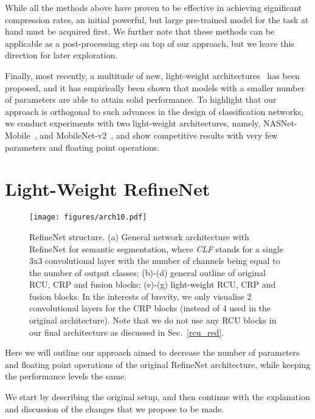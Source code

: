 \documentclass{bmvc2k}
\begin{document}
While all the methods above have proven to be effective in achieving significant compression rates, an initial powerful, but large pre-trained model for the task at hand must be acquired first. We further note that these methods can be applicable as a post-processing step on top of our approach, but we leave this direction for later exploration.

Finally, most recently, a multitude of new, light-weight architectures~\cite{IandolaMAHDK16,HowardZCKWWAA17} has been proposed, and it has empirically been shown that models with a smaller number of parameters are able to attain solid performance. To highlight that our approach is orthogonal to such advances in the design of classification networks, we conduct experiments with two light-weight architectures, namely, NASNet-Mobile~\cite{ZophVSL17}, and MobileNet-v2~\cite{abs-1801-04381}, and show competitive results with very few parameters and floating point operations.
\vspace{-0.12in}

\section{Light-Weight RefineNet}
\label{sec:blind}






\begin{figure*}
\begin{center}
	\texttt{[image: figures/arch10.pdf]}
\end{center}
	\vskip -0.23in
	\caption{RefineNet structure. (a) General network architecture with RefineNet for semantic segmentation, where \textit{CLF} stands for a single 3x3 convolutional layer with the number of channels being equal to the number of output classes; (b)-(d) general outline of original RCU, CRP and fusion blocks; (e)-(g) light-weight RCU, CRP and fusion blocks. In the interests of brevity, we only visualise 2 convolutional layers for the CRP blocks (instead of 4 used in the original architecture). Note that we do not use any RCU blocks in our final architecture as discussed in Sec.~\ref{rcu_red}.}
	\label{fig:arch}
	\vskip -0.2in
\end{figure*}

Here we will outline our approach aimed to decrease the number of parameters and floating point operations of the original RefineNet architecture, while keeping the performance levels the same.\par
We start by describing the original setup, and then continue with the explanation and discussion of the changes that we propose to be made.
\end{document}
